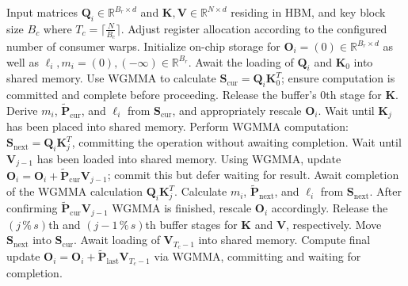 \begin{enumerate}
\begin{algorithm}[H]
    \caption{\small\label{alg:flash3_wgmma}\textsc{FlashAttention-3} Consumer Warpgroup Forward Pass}
    \begin{algorithmic}[1]
      \REQUIRE  Input matrices $\mathbf{Q}_i \in \mathbb{R}^{B_r \times d}$ and $\mathbf{K}, \mathbf{V} \in \mathbb{R}^{N \times d}$ residing in HBM, and key block size $B_c$ where $T_c = \lceil \frac{N}{B_c} \rceil$.
      \STATE Adjust register allocation according to the configured number of consumer warps.
      \STATE Initialize on-chip storage for $\mathbf{O}_i = (0) \in \mathbb{R}^{B_r \times d}$ as well as $\ell_i, m_i = (0), (-\infty) \in \mathbb{R}^{B_r}$.
      \STATE Await the loading of $\mathbf{Q}_i$ and $\mathbf{K}_0$ into shared memory.
      \STATE Use WGMMA to calculate $\mathbf{S}_{\mathrm{cur}} = \mathbf{Q}_i \mathbf{K}_0^T$; ensure computation is committed and complete before proceeding.
      \STATE Release the buffer's $0$th stage for $\mathbf{K}$.
      \STATE Derive $m_{i}$, $\tilde{\mathbf{P}}_{\mathrm{cur}}$, and $\ell_{i}$ from $\mathbf{S}_{\mathrm{cur}}$, and appropriately rescale $\mathbf{O}_i$.
        \STATE Wait until $\mathbf{K}_j$ has been placed into shared memory.
        \label{code:mainloop_start}
        \STATE Perform WGMMA computation: $\mathbf{S}_{\mathrm{next}} = \mathbf{Q}_i \mathbf{K}_{j}^T$, committing the operation without awaiting completion. \label{code:first_wgmma}
        \STATE Wait until $\mathbf{V}_{j-1}$ has been loaded into shared memory.
        \STATE Using WGMMA, update $\mathbf{O}_{i} = \mathbf{O}_{i} + \tilde{\mathbf{P}}_{\mathrm{cur}} \mathbf{V}_{j-1}$; commit this but defer waiting for result. \label{code:second_wgmma}
        \STATE Await completion of the WGMMA calculation $\mathbf{Q}_i \mathbf{K}_{j}^T$.
        \STATE Calculate $m_{i}$, $\tilde{\mathbf{P}}_{\mathrm{next}}$, and $\ell_{i}$ from $\mathbf{S}_{\mathrm{next}}$. \label{code:softmax}
        \STATE After confirming $\tilde{\mathbf{P}}_{\mathrm{cur}} \mathbf{V}_{j-1}$ WGMMA is finished, rescale $\mathbf{O}_i$ accordingly.
        \STATE Release the $(j\,\%\,s)$th and $(j-1\,\%\,s)$th buffer stages for $\mathbf{K}$ and $\mathbf{V}$, respectively.
        \STATE Move $\mathbf{S}_{\mathrm{next}}$ into $\mathbf{S}_{\mathrm{cur}}$.
        \label{code:mainloop_end}
      \ENDFOR \STATE Await loading of $\mathbf{V}_{T_c - 1}$ into shared memory.
      \STATE Compute final update $\mathbf{O}_{i} = \mathbf{O}_{i} + \tilde{\mathbf{P}}_{\mathrm{last}} \mathbf{V}_{T_c - 1}$ via WGMMA, committing and waiting for completion.


\end{algorithmic}
\end{algorithm}
\end{enumerate}
